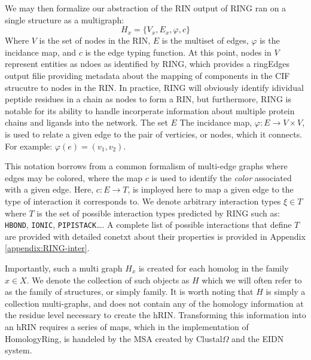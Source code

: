 We may then formalize our abstraction of the RIN output of RING ran on a single structure as a multigraph:
$$
H_x = \{ V_x, E_x, \varphi, c\}
$$
Where $V$ is the set of nodes in the RIN, $E$ is the multiset of edges, $\varphi$ is the incidance map, and $c$ is the edge typing function. 
At this point, nodes in $V$ represent entities as ndoes as identified by RING, which provides a ringEdges output filie providing metadata about the mapping of components in the CIF strucutre to nodes in the RIN. In practice, RING will obviously identify idividual peptide residues in a chain as nodes to form a RIN, but furthermore, RING is notable for its ability to handle incorperate information about multiple protein chains and ligands into the network. 
The set $E$
The incidance map, $\varphi: E \to V \times V$, is used to relate a given edge to the pair of verticies, or nodes, which it connects. For example: $\varphi(e) = (v_1, v_2)$.

This notation borrows from a common formalism of multi-edge graphs where edges may be colored, where the map  $c$ is used to identify the \emph{color} associated with a given edge. Here, $c: E \to T$, is imployed here to map a given edge to the type of interaction it corresponds to. We denote arbitrary interaction types $\xi \in T$ where $T$ is the set of possible interaction types predicted by RING such as: \texttt{HBOND}, \texttt{IONIC}, \texttt{PIPISTACK}\ldots. A complete list of possible interactions that define $T$ are provided with detailed conetxt about their properties is provided in Appendix \ref{appendix:RING-inter}.

Importantly, such a multi graph $H_x$ is created for each homolog in the family $x \in X$. We denote the collection of such objects as $H$ which we will often refer to as the family of structures, or simply family. 
It is worth noting that $H$ is simply a collection multi-graphs, and does not contain any of the homology information at the residue level necessary to create the hRIN. 
Transforming this information into an hRIN requires a series of maps, which in the implementation of HomologyRing, is handeled by the MSA created by Clustal$\Omega$ and the EIDN system. 

